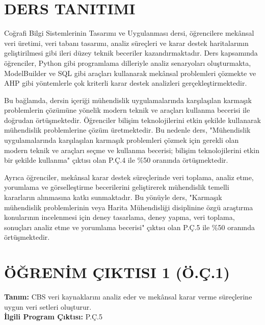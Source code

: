 \documentclass[12pt,a4paper]{article}
\begin{document}
\newpage

\section*{DERS TANITIMI}
Coğrafi Bilgi Sistemlerinin Tasarımı ve Uygulanması dersi, öğrencilere mekânsal veri üretimi, veri tabanı tasarımı, analiz süreçleri ve karar destek haritalarının geliştirilmesi gibi ileri düzey teknik beceriler kazandırmaktadır. Ders kapsamında öğrenciler, Python gibi programlama dilleriyle analiz senaryoları oluşturmakta, ModelBuilder ve SQL gibi araçları kullanarak mekânsal problemleri çözmekte ve AHP gibi yöntemlerle çok kriterli karar destek analizleri gerçekleştirmektedir.

Bu bağlamda, dersin içeriği mühendislik uygulamalarında karşılaşılan karmaşık problemlerin çözümüne yönelik modern teknik ve araçları kullanma becerisi ile doğrudan örtüşmektedir. Öğrenciler bilişim teknolojilerini etkin şekilde kullanarak mühendislik problemlerine çözüm üretmektedir. Bu nedenle ders, "Mühendislik uygulamalarında karşılaşılan karmaşık problemleri çözmek için gerekli olan modern teknik ve araçları seçme ve kullanma becerisi; bilişim teknolojilerini etkin bir şekilde kullanma" çıktısı olan P.Ç.4 ile \%50 oranında örtüşmektedir.

Ayrıca öğrenciler, mekânsal karar destek süreçlerinde veri toplama, analiz etme, yorumlama ve görselleştirme becerilerini geliştirerek mühendislik temelli kararların alınmasına katkı sunmaktadır. Bu yönüyle ders, "Karmaşık mühendislik problemlerinin veya Harita Mühendisliği disiplinine özgü araştırma konularının incelenmesi için deney tasarlama, deney yapma, veri toplama, sonuçları analiz etme ve yorumlama becerisi" çıktısı olan P.Ç.5 ile \%50 oranında örtüşmektedir.

\newpage

\section*{ÖĞRENİM ÇIKTISI 1 (Ö.Ç.1)}
\textbf{Tanım:} CBS veri kaynaklarını analiz eder ve mekânsal karar verme süreçlerine uygun veri setleri oluşturur.\\
\textbf{İlgili Program Çıktısı:} P.Ç.5
\end{document}
